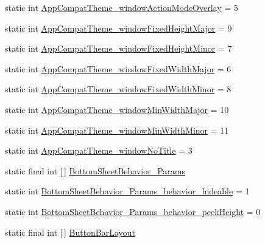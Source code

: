\begin{DoxyCompactItemize}
\item 
static int \hyperlink{classandroid_1_1support_1_1v7_1_1appcompat_1_1R_1_1styleable_a68fc3502f128d8ccc5f6cb4fe4662317}{App\+Compat\+Theme\+\_\+window\+Action\+Mode\+Overlay} = 5
\item 
static int \hyperlink{classandroid_1_1support_1_1v7_1_1appcompat_1_1R_1_1styleable_ad39d6f1f8f5f5276ffcd26e8ba52a62a}{App\+Compat\+Theme\+\_\+window\+Fixed\+Height\+Major} = 9
\item 
static int \hyperlink{classandroid_1_1support_1_1v7_1_1appcompat_1_1R_1_1styleable_a5ea54cdfaf428b78c942f5de400a165f}{App\+Compat\+Theme\+\_\+window\+Fixed\+Height\+Minor} = 7
\item 
static int \hyperlink{classandroid_1_1support_1_1v7_1_1appcompat_1_1R_1_1styleable_aa1e116caa12a145c67596dd4910cfd53}{App\+Compat\+Theme\+\_\+window\+Fixed\+Width\+Major} = 6
\item 
static int \hyperlink{classandroid_1_1support_1_1v7_1_1appcompat_1_1R_1_1styleable_a373701a9ce98e38b9d2527222d764011}{App\+Compat\+Theme\+\_\+window\+Fixed\+Width\+Minor} = 8
\item 
static int \hyperlink{classandroid_1_1support_1_1v7_1_1appcompat_1_1R_1_1styleable_afd626a38693cbcfdd8ac1d5ff7c02a96}{App\+Compat\+Theme\+\_\+window\+Min\+Width\+Major} = 10
\item 
static int \hyperlink{classandroid_1_1support_1_1v7_1_1appcompat_1_1R_1_1styleable_a907f4aa44d62f6a4a0f50520dea3f4f1}{App\+Compat\+Theme\+\_\+window\+Min\+Width\+Minor} = 11
\item 
static int \hyperlink{classandroid_1_1support_1_1v7_1_1appcompat_1_1R_1_1styleable_a3d6aa74951e0bed5e26ea58ec3e818f6}{App\+Compat\+Theme\+\_\+window\+No\+Title} = 3
\item 
static final int \mbox{[}$\,$\mbox{]} \hyperlink{classandroid_1_1support_1_1v7_1_1appcompat_1_1R_1_1styleable_aed00e7319fe5debc6a1621afa2ca6bb5}{Bottom\+Sheet\+Behavior\+\_\+\+Params}
\item 
static int \hyperlink{classandroid_1_1support_1_1v7_1_1appcompat_1_1R_1_1styleable_a858d753f704250c67e60a9a949fb1713}{Bottom\+Sheet\+Behavior\+\_\+\+Params\+\_\+behavior\+\_\+hideable} = 1
\item 
static int \hyperlink{classandroid_1_1support_1_1v7_1_1appcompat_1_1R_1_1styleable_a6da8e778122e08e2149ff3d5f02d8f79}{Bottom\+Sheet\+Behavior\+\_\+\+Params\+\_\+behavior\+\_\+peek\+Height} = 0
\item 
static final int \mbox{[}$\,$\mbox{]} \hyperlink{classandroid_1_1support_1_1v7_1_1appcompat_1_1R_1_1styleable_a7c65a92be88c9f9803f46314aaabe499}{Button\+Bar\+Layout}

\end{DoxyCompactItemize}
